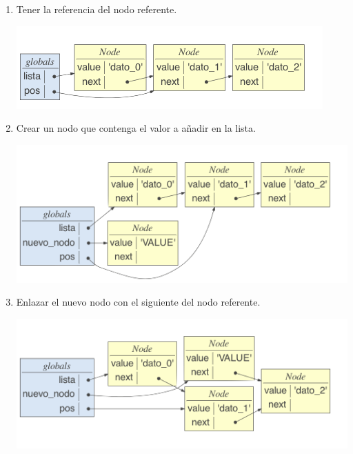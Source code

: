 \begin{enumerate}
\item Tener la referencia del nodo referente.

\hfil\begin{minipage}{.3\textwidth}
\end{minipage}
\begin{minipage}{.6\textwidth}
\includegraphics[width=.8\textwidth]{input/05-List-fig/ejemListaSingleLinkedInsert1}
\end{minipage}


\item Crear un nodo que contenga el valor a añadir en la lista.

\hfil\begin{minipage}{.3\textwidth}
\end{minipage}
\begin{minipage}{.6\textwidth}
\includegraphics[width=.8\textwidth]{input/05-List-fig/ejemListaSingleLinkedInsert2}
\end{minipage}

\item Enlazar el nuevo nodo con el siguiente del nodo referente.

\hfil\begin{minipage}{.3\textwidth}
\end{minipage}
\begin{minipage}{.6\textwidth}
\includegraphics[width=.8\textwidth]{input/05-List-fig/ejemListaSingleLinkedInsert3}
\end{minipage}


\end{enumerate}
